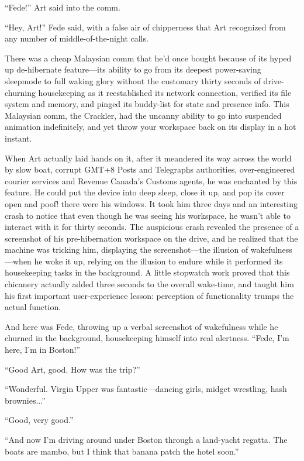 “Fede!” Art said into the comm.

“Hey, Art!” Fede said, with a false air of chipperness that Art
recognized from any number of middle-of-the-night calls.

There was a cheap Malaysian comm that he’d once bought because of
its hyped up de-hibernate feature—its ability to go from its
deepest power-saving sleepmode to full waking glory without the
customary thirty seconds of drive-churning housekeeping as it
reestablished its network connection, verified its file system and
memory, and pinged its buddy-list for state and presence info. This
Malaysian comm, the Crackler, had the uncanny ability to go into
suspended animation indefinitely, and yet throw your workspace back
on its display in a hot instant.

When Art actually laid hands on it, after it meandered its way
across the world by slow boat, corrupt GMT+8 Posts and Telegraphs
authorities, over-engineered courier services and Revenue Canada’s
Customs agents, he was enchanted by this feature. He could put the
device into deep sleep, close it up, and pop its cover open and
poof! there were his windows. It took him three days and an
interesting crash to notice that even though he was seeing his
workspace, he wasn’t able to interact with it for thirty seconds.
The auspicious crash revealed the presence of a screenshot of his
pre-hibernation workspace on the drive, and he realized that the
machine was tricking him, displaying the screenshot—the illusion of
wakefulness—when he woke it up, relying on the illusion to endure
while it performed its housekeeping tasks in the background. A
little stopwatch work proved that this chicanery actually added
three seconds to the overall wake-time, and taught him his first
important user-experience lesson: perception of functionality
trumps the actual function.

And here was Fede, throwing up a verbal screenshot of wakefulness
while he churned in the background, housekeeping himself into real
alertness. “Fede, I’m here, I’m in Boston!”

“Good Art, good. How was the trip?”

“Wonderful. Virgin Upper was fantastic—dancing girls, midget
wrestling, hash brownies...”

“Good, very good.”

“And now I’m driving around under Boston through a land-yacht
regatta. The boats are mambo, but I think that banana patch the
hotel soon.”

